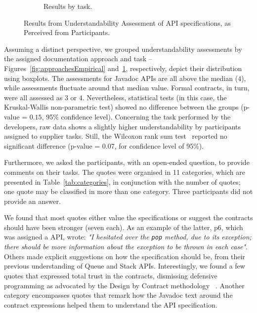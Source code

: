 \begin{figure}
\begin{subfigure}{.33\textwidth}
\caption{Results by task.}
\label{fig:tasksEmpirical}
\end{subfigure}
\caption{Results from Understandability Assessment of API specifications, as Perceived from Participants.}
\label{fig:empiricalResults}
\end{figure}

Assuming a distinct perspective, we grouped understandability assessments by the assigned documentation approach and task -- Figures~\ref{fig:approachesEmpirical} and~\ref{fig:tasksEmpirical}, respectively, depict their distribution using boxplots.
The assessments for Javadoc APIs are all above the median ($4$), while \contractjdoc{} assessments fluctuate around that median value. Formal contracts, in turn, were all assessed as $3$ or $4$.  
Nevertheless, statistical tests (in this case, the Kruskal-Wallis non-parametric test) showed no difference between the groups (p-value = $0.15$, 95\% confidence level).
Concerning the task performed by the developers, raw data shows a slightly higher understandability by participants assigned to supplier tasks. Still, the Wilcoxon rank sum test~\cite{statistical} reported no significant difference (p-value = 0.07, for confidence level of 95\%).

Furthermore, we asked the participants, with an open-ended question, to provide comments on their tasks.
The quotes were organised in 11 categories, which are presented in Table~\ref{tab:categories}, in conjunction with the number of quotes; one quote may be classified in more than one category. Three participants did not provide an answer.

We found that most quotes either value the specifications or suggest the contracts should have been stronger (seven each). As an example of the latter, p6, which was assigned a \contractjdoc{} API, wrote: \emph{"I hesitated over the \texttt{pop} method, due to its exception; there should be more information about the exception to be thrown in each case"}. 
Others made explicit suggestions on how the specification should be, from their previous understanding of Queue and Stack APIs.
Interestingly, we found a few quotes that expressed total trust in the contracts, dismissing defensive programming as advocated by the Design by Contract methodology ~\cite{dbc}.
Another category encompasses quotes that remark how the Javadoc text around the contract expressions helped them to understand the API specification. 

